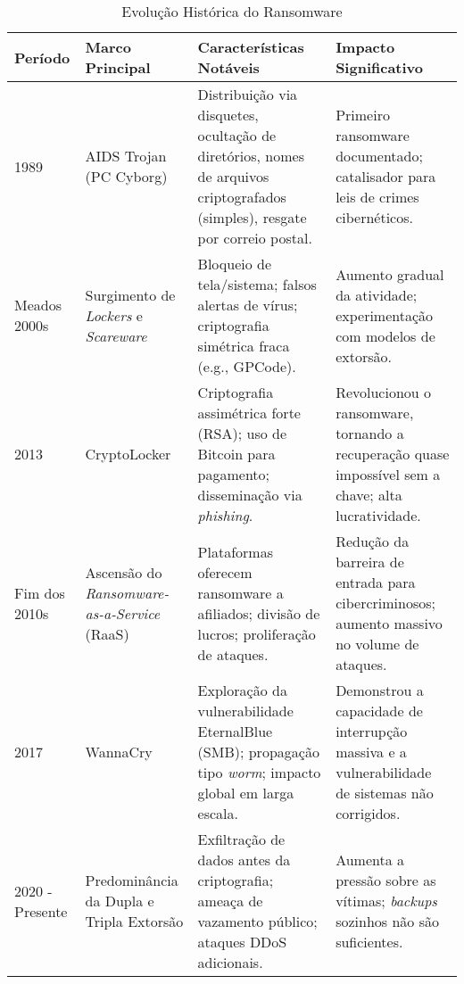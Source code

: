 
\begin{table}[H] %
    \centering
    \small
    \caption{Evolução Histórica do Ransomware}
    \label{tab:evolucao_historica}
    \sloppy %
    \begin{tabularx}{\textwidth}{|l|p{3cm}|p{5cm}|p{5cm}|}
        \hline
        \textbf{Período} & \textbf{Marco Principal} & \textbf{Características Notáveis} & \textbf{Impacto Significativo} \\ \hline
        1989 & AIDS Trojan (PC Cyborg) & Distribuição via disquetes, ocultação de diretórios, nomes de arquivos criptografados (simples), resgate por correio postal. & Primeiro ransomware documentado; catalisador para leis de crimes cibernéticos. \cite{CyberMaxxRansomwareHistory, Muniandy2024Ransomware, WatchGuardAIDSTrojan} \\ \hline
        Meados 2000s & Surgimento de \textit{Lockers} e \textit{Scareware} & Bloqueio de tela/sistema; falsos alertas de vírus; criptografia simétrica fraca (e.g., GPCode). & Aumento gradual da atividade; experimentação com modelos de extorsão. \cite{Tanni2022RedAlert, MasterDCRansomwareHowItWorks, Robb2024RansomwareHistory} \\ \hline
        2013 & CryptoLocker & Criptografia assimétrica forte (RSA); uso de Bitcoin para pagamento; disseminação via \textit{phishing}. & Revolucionou o ransomware, tornando a recuperação quase impossível sem a chave; alta lucratividade. \cite{CyberMaxxRansomwareHistory, Muniandy2024Ransomware, Robb2024RansomwareHistory} \\ \hline
        Fim dos 2010s & Ascensão do \textit{Ransomware-as-a-Service} (RaaS) & Plataformas oferecem ransomware a afiliados; divisão de lucros; proliferação de ataques. & Redução da barreira de entrada para cibercriminosos; aumento massivo no volume de ataques. \cite{CyberMaxxRansomwareHistory, Robb2024RansomwareHistory} \\ \hline
        2017 & WannaCry & Exploração da vulnerabilidade EternalBlue (SMB); propagação tipo \textit{worm}; impacto global em larga escala. & Demonstrou a capacidade de interrupção massiva e a vulnerabilidade de sistemas não corrigidos. \cite{CyberMaxxRansomwareHistory, WikipediaWannaCry} \\ \hline
        2020 - Presente & Predominância da Dupla e Tripla Extorsão & Exfiltração de dados antes da criptografia; ameaça de vazamento público; ataques DDoS adicionais. & Aumenta a pressão sobre as vítimas; \textit{backups} sozinhos não são suficientes. \cite{CyberMaxxRansomwareHistory, Robb2024RansomwareHistory, ThreatDownALPHVBlackCat, AkamaiBlackCatRansomware} \\ \hline

\end{tabularx}
\end{table}
